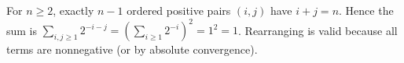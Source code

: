 For $n\ge2$, exactly $n-1$ ordered positive pairs $(i,j)$ have $i+j=n$. Hence the sum is $\sum_{i,j\ge1}2^{-i-j}=(\sum_{i\ge1}2^{-i})^2=1^2=\boxed1$. Rearranging is valid because all terms are nonnegative (or by absolute convergence).
